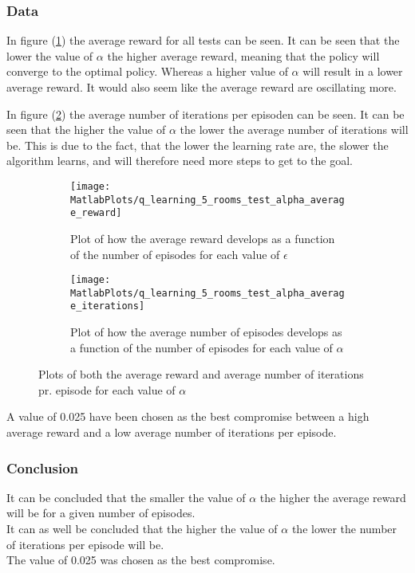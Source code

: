 \documentclass[../Head/Main.tex]{subfiles}
\begin{document}
\clearpage
\subsubsection*{Data}
In figure (\ref{fig:q-learn_alpha_reward}) the average reward for all tests can be seen. It can be seen that the lower the value of $\alpha$ the higher average reward, meaning that the policy will converge to the optimal policy. Whereas a higher value of $\alpha$ will result in a lower average reward. It would also seem like the average reward are oscillating more.\par
In figure (\ref{fig:q-learn_alpha_iterations}) the average number of iterations per episoden can be seen. It can be seen that the higher the value of $\alpha$ the lower the average number of iterations will be. This is due to the fact, that the lower the learning rate are, the slower the algorithm learns, and will therefore need more steps to get to the goal.
\begin{figure}[H]
	\centering
	\begin{subfigure}[b]{0.49\textwidth}
		\centering
		\texttt{[image: MatlabPlots/q\_learning\_5\_rooms\_test\_alpha\_average\_reward]}
		\caption{Plot of how the average reward develops as a function of the number of episodes for each value of $\epsilon$}
		\label{fig:q-learn_alpha_reward}
	\end{subfigure}
	\hfill
	\begin{subfigure}[b]{0.49\textwidth}
		\centering
		\texttt{[image: MatlabPlots/q\_learning\_5\_rooms\_test\_alpha\_average\_iterations]}
		\caption{Plot of how the average number of episodes develops as a function of the number of episodes for each value of $\alpha$}
		\label{fig:q-learn_alpha_iterations}
	\end{subfigure}
	\caption{Plots of both the average reward and average number of iterations pr. episode for each value of $\alpha$}
	\label{fig:q-learn_alpha}
\end{figure}
A value of 0.025 have been chosen as the best compromise between a high average reward and a low average number of iterations per episode.

\subsubsection*{Conclusion}
It can be concluded that the smaller the value of $\alpha$ the higher the average reward will be for a given number of episodes.\\
It can as well be concluded that the higher the value of $\alpha$ the lower the number of iterations per episode will be.\\ 
The value of 0.025 was chosen as the best compromise.
\end{document}
